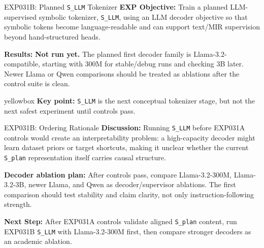 \documentclass[aspectratio=169,11pt]{beamer}
\newcommand{\missing}[1]{{\color{missingred}\textbf{#1}}}
\newcommand{\code}[1]{\texttt{\footnotesize #1}}
\newcommand{\expfield}[2]{\textbf{#1:} #2\par\vspace{0.10cm}}
\newenvironment{keybox}{%
  \begin{beamercolorbox}[rounded=true,sep=0.14cm,wd=\linewidth]{yellowbox}\footnotesize%
}{%
  \end{beamercolorbox}%
}
\begin{document}
\begin{frame}{EXP031B: Planned \code{S\_LLM} Tokenizer}
  \footnotesize
  \expfield{EXP Objective}{Train a planned LLM-supervised symbolic tokenizer, \code{S\_LLM}, using an LLM decoder objective so that symbolic tokens become language-readable and can support text/MIR supervision beyond hand-structured heads.}
  \expfield{Results}{\missing{Not run yet.} The planned first decoder family is Llama-3.2-compatible, starting with 300M for stable/debug runs and checking 3B later. Newer Llama or Qwen comparisons should be treated as ablations after the control suite is clean.}
  \begin{keybox}\textbf{Key point:} \code{S\_LLM} is the next conceptual tokenizer stage, but not the next safest experiment until controls pass.\end{keybox}
\end{frame}

\begin{frame}{EXP031B: Ordering Rationale}
  \footnotesize
  \expfield{Discussion}{Running \code{S\_LLM} before EXP031A controls would create an interpretability problem: a high-capacity decoder might learn dataset priors or target shortcuts, making it unclear whether the current \code{S\_plan} representation itself carries causal structure.}
  \expfield{Decoder ablation plan}{After controls pass, compare Llama-3.2-300M, Llama-3.2-3B, newer Llama, and Qwen as decoder/supervisor ablations. The first comparison should test stability and claim clarity, not only instruction-following strength.}
  \vspace{0.18cm}
  \expfield{Next Step}{After EXP031A controls validate aligned \code{S\_plan} content, run EXP031B \code{S\_LLM} with Llama-3.2-300M first, then compare stronger decoders as an academic ablation.}
\end{frame}
\end{document}
